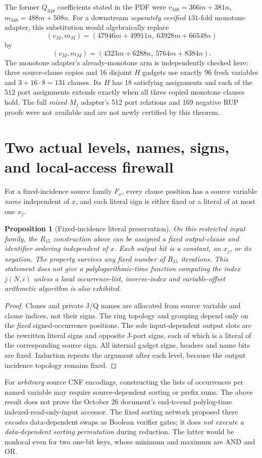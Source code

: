 \documentclass[11pt]{article}
\newtheorem{proposition}[theorem]{Proposition}
\begin{document}
The former \(Q_{348}\) coefficients stated in the PDF were
\(v_{348}=366m+381n\), \(m_{348}=488m+508n\).
For a downstream \emph{separately verified} \(131\)-fold
monotone adapter, this substitution would algebraically replace
\[
(v_M,m_M)=(47946m+49911n,\ 63928m+66548n)
\]
by
\[
\boxed{(v_M,m_M)=(4323m+6288n,\ 5764m+8384n).}
\]
The monotone adapter's already-monotone arm is independently checked
here: three source-clause copies and 16 disjoint \(H\) gadgets use
exactly 96 fresh variables and \(3+16\cdot8=131\) clauses.
Its \(H\) has 18 satisfying assignments and each of the \(512\)
port assignments extends exactly when all three copied monotone
clauses hold. The full \emph{mixed} \(M_j\) adapter's 512 port
relations and 169 negative RUP proofs were not available and are
not newly certified by this theorem.

\section{Two actual levels, names, signs, and local-access firewall}
For a fixed-incidence source family \(F_x\), every clause position has
a source variable \emph{name} independent of \(x\), and each literal
sign is either fixed or a literal of at most one \(x_j\).
\begin{proposition}[Fixed-incidence literal preservation]
On this restricted input family, the \(R_{15}\) construction above
can be assigned a fixed output-clause and identifier ordering
independent of \(x\). Each output bit is a constant, an \(x_j\),
or its negation. The property survives any \emph{fixed number}
of \(R_{15}\) iterations. This statement does \emph{not}
give a polylogarithmic-time function computing the index \(j(N,i)\)
unless a local occurrence-list, inverse-index and variable-offset
arithmetic algorithm is also exhibited.
\end{proposition}
\begin{proof}
Clones and private J/Q names are allocated from source variable and
clause indices, not their signs. The ring topology and grouping
depend only on the \emph{fixed} signed-occurrence positions.
The sole input-dependent output slots are the rewritten
literal signs and opposite J-port signs, each of which is
a literal of the corresponding source sign. All internal
gadget signs, headers and name bits are fixed. Induction
repeats the argument after each level, because the output
incidence topology remains fixed.
\end{proof}
For \emph{arbitrary} source CNF encodings, constructing the
lists of occurrences per named variable may require source-dependent
sorting or prefix sums. The above result does not prove the
October 26 document's end-to-end polylog-time
indexed-read-only-input accessor. The fixed sorting network proposed
there \emph{encodes} data-dependent swaps as Boolean verifier gates;
it does \emph{not execute a data-dependent sorting permutation}
during reduction. The latter would be nonlocal even for
two one-bit keys, whose minimum and maximum are AND and OR.
\end{document}
